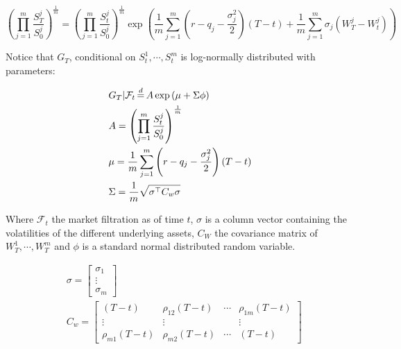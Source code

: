 \begin{equation}\label{eq:geom_digital_distrib}
\left(\prod_{j=1}^m\frac{S_{T}^{j}}{S_{0}^{j}}\right)^{\frac{1}{m}} =\left(\prod_{j=1}^m\frac{S_{t}^{j}}{S_{0}^{j}}\right)^{\frac{1}{m}}\exp\left(\frac{1}{m} \sum_{j=1}^{m}\left(r-q_{j}-\frac{\sigma_{j}^{2}}{2}\right) \left(T-t\right)+\frac{1}{m} \sum_{j=1}^{m} \sigma_{j} \left(W_{T}^{j}-W_{t}^{j}\right)\right) 
\end{equation}

Notice that $G_T$, conditional on $S_t^1,\cdots,S_t^m$ is log-normally distributed with parameters:



\begin{equation} 
\label{eq:geom_digital_distrib_params1}
\begin{aligned} 
& G_T|\mathcal{F}_t \eqdistr A \exp\left(\mu+\Sigma\phi\right)\\
& A = \left(\prod_{j=1}^m\frac{S_{t}^{j}}{S_{0}^{j}}\right)^{\frac{1}{m}} \\
&\mu = \frac{1}{m}\sum_{j=1}^{m}\left(r-q_{j}-\frac{\sigma_{j}^{2}}{2}\right)\left(T-t\right) \\   
& \Sigma=\frac{1}{m}\sqrt{\sigma^{\top} C_{w} \sigma}
\end{aligned}
\end{equation}

Where $\mathcal{F}_t$ the market filtration as of time $t$, $\sigma$ is a column vector containing the volatilities of the different underlying assets, $C_W$ the covariance matrix of $W_T^1,\cdots,W_T^m$ and $\phi$ is a standard normal distributed random variable.

\begin{equation} \label{eq:geom_digital_distrib_params2}
\begin{aligned}
&\sigma=\left[\begin{array}{c}
\sigma_{1} \\
\vdots \\
\sigma_{m}
\end{array}\right] \\
&C_{w}=\left[\begin{array}{cccc}
\left(T-t\right) & \rho_{12} \left(T-t\right) & \cdots & \rho_{1 m} \left(T-t\right) \\
\vdots & \vdots & & \vdots \\
\rho_{m 1} \left(T-t\right) & \rho_{m 2} \left(T-t\right) & \cdots &  \left(T-t\right)
\end{array}\right]
\end{aligned}
\end{equation} 

